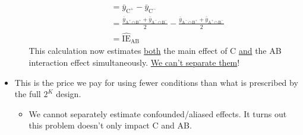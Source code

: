 \begin{itemize}
\begin{itemize}
\begin{align*}
                         & =\bar{y}_{\text{C}^+}-\bar{y}_{\text{C}^-}                                                                                                                           \\
                         & =\frac{\bar{y}_{\text{A}^+\cap \text{B}^+}+\bar{y}_{\text{A}^-\cap \text{B}^-}}{2}-\frac{\bar{y}_{\text{A}^-\cap \text{B}^+}+\bar{y}_{\text{A}^+\cap \text{B}^-}}{2} \\
                         & =\widehat{\text{IE}}_{\text{AB}}
                    \end{align*}
                    This calculation now estimates \underline{both} the main effect of C \underline{and} the AB interaction effect simultaneously. \underline{We can't separate them}!
          \end{itemize}
    \item This is the price we pay for using fewer conditions than what is prescribed by the full $2^K$ design.
          \begin{itemize}[$\hookrightarrow$]
              \item We cannot separately estimate confounded/aliased effects. It turns out this problem doesn't only impact C and AB\@.
          \end{itemize}
\end{itemize}
